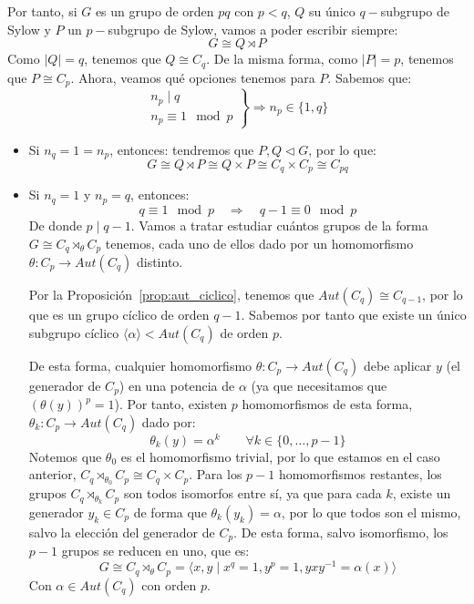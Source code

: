 Por tanto, si $G$ es un grupo de orden $pq$ con $p<q$, $Q$ su único $q-$subgrupo de Sylow y $P$ un $p-$subgrupo de Sylow, vamos a poder escribir siempre:
\begin{equation*}
    G \cong Q\rtimes P
\end{equation*}
Como $|Q| = q$, tenemos que $Q\cong C_q$. De la misma forma, como $|P| = p$, tenemos que $P\cong C_p$. Ahora, veamos qué opciones tenemos para $P$. Sabemos que:
\begin{equation*}
    \left.\begin{array}{r}
        n_p \mid q \\
        n_p \equiv 1 \mod p
    \end{array}\right\} \Longrightarrow n_p \in \{1,q\}
\end{equation*}
\begin{itemize}
    \item Si $n_q = 1 = n_p$, entonces: tendremos que $P, Q\lhd G$, por lo que:
        \begin{equation*}
            G\cong Q\rtimes P \cong Q\times P \cong C_q \times C_p \cong C_{pq}
        \end{equation*}
    \item Si $n_q = 1$ y $n_p = q$, entonces:
        \begin{equation*}
            q \equiv 1 \mod p \quad \Longrightarrow \quad  q-1\equiv 0 \mod p
        \end{equation*}
        De donde $p\mid q-1$. Vamos a tratar estudiar cuántos grupos de la forma $G\cong C_q\rtimes_\theta C_p$ tenemos, cada uno de ellos dado por un homomorfismo $\theta:C_p\to Aut(C_q)$ distinto. 

        Por la Proposición~\ref{prop:aut_ciclico}, tenemos que $Aut(C_q)\cong C_{q-1}$, por lo que es un grupo cíclico de orden $q-1$. Sabemos por tanto que existe un único subgrupo cíclico $\langle \alpha \rangle < Aut(C_q) $ de orden $p$. 

        De esta forma, cualquier homomorfismo $\theta:C_p\to Aut(C_q)$ debe aplicar $y$ (el generador de $C_p$) en una potencia de $\alpha$ (ya que necesitamos que ${(\theta(y))}^{p} = 1$). Por tanto, existen $p$ homomorfismos de esta forma, $\theta_k:C_p\to Aut(C_q)$ dado por:
        \begin{equation*}
            \theta_k(y) = \alpha^k \qquad \forall k \in \{0,\ldots,p-1\}
        \end{equation*}
        Notemos que $\theta_0$ es el homomorfismo trivial, por lo que estamos en el caso anterior, $C_q\rtimes_{\theta_0} C_p \cong C_q\times C_p$. Para los $p-1$ homomorfismos restantes, los grupos $C_q\rtimes_{\theta_k} C_p$ son todos isomorfos entre sí, ya que para cada $k$, existe un generador $y_k \in C_p$ de forma que $\theta_k(y_k) = \alpha$, por lo que todos son el mismo, salvo la elección del generador de $C_p$. De esta forma, salvo isomorfismo, los $p-1$ grupos se reducen en uno, que es:
        \begin{equation*}
            G \cong C_q\rtimes_\theta C_p = \langle x,y \mid x^q = 1, y^p = 1, yxy^{-1}= \alpha(x) \rangle 
        \end{equation*}
        Con $\alpha\in Aut(C_q)$ con orden $p$.
\end{itemize}

